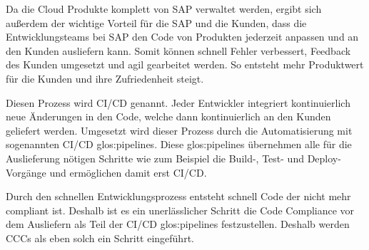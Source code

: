 \documentclass[../main.tex]{subfiles}
\begin{document}
Da die Cloud Produkte komplett von SAP verwaltet werden, ergibt sich außerdem der wichtige Vorteil für die SAP und die Kunden, dass die Entwicklungsteams bei SAP den Code von Produkten jederzeit anpassen und an den Kunden ausliefern kann.
Somit können schnell Fehler verbessert, Feedback des Kunden umgesetzt und agil gearbeitet werden.
So entsteht mehr Produktwert für die Kunden und ihre Zufriedenheit steigt.


Diesen Prozess wird \gls{CI/CD} genannt.
Jeder Entwickler integriert kontinuierlich neue Änderungen in den Code, welche dann kontinuierlich an den Kunden geliefert werden.
Umgesetzt wird dieser Prozess durch die Automatisierung mit sogenannten \gls{CI/CD} \glspl{glos:pipeline}.
Diese \glspl{glos:pipeline} übernehmen alle für die Auslieferung nötigen Schritte wie zum Beispiel die Build-, Test- und Deploy-Vorgänge und ermöglichen damit erst \gls{CI/CD}.
\cite{CI/CD}

Durch den schnellen Entwicklungsprozess entsteht schnell Code der nicht mehr compliant ist.
Deshalb ist es ein unerlässlicher Schritt die Code Compliance vor dem Ausliefern als Teil der \gls{CI/CD} \glspl{glos:pipeline} festzustellen.
Deshalb werden \glspl{CCC} als eben solch ein Schritt eingeführt.
\end{document}
